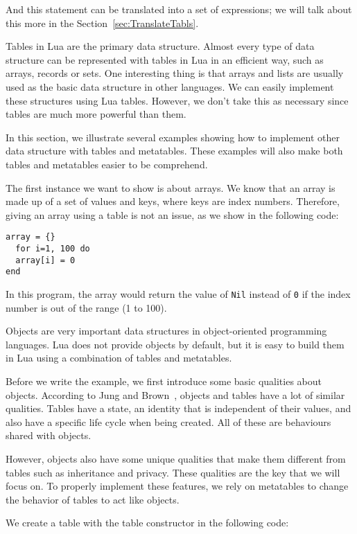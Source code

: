 And this statement can be translated into a set of expressions; we will talk about this more in the Section~\ref{sec:TranslateTabls}.

Tables in Lua are the primary data structure. Almost every type of data structure can be represented with tables in Lua in an efficient way, such as arrays, records or sets. One interesting thing is that arrays and lists are usually used as the basic data structure in other languages. We can easily implement these structures using Lua tables. However, we don't take this as necessary since tables are much more powerful than them.

In this section, we illustrate several examples showing how to implement other data structure with tables and metatables. These examples will also make both tables and metatables easier to be comprehend.

The first instance we want to show is about arrays. We know that an array is made up of a set of values and keys, where keys are index numbers. Therefore, giving an array using a table is not an issue, as we show in the following code:

\begin{verbatim}
array = {}
  for i=1, 100 do
  array[i] = 0
end
\end{verbatim}

In this program, the array would return the value of {\tt Nil} instead of {\tt 0} if the index number is out of the range (1 to 100).

Objects are very important data structures in object-oriented programming languages. Lua does not provide objects by default, but it is easy to build them in Lua using a combination of tables and metatables.

Before we write the example, we first introduce some basic qualities about objects. According to Jung and Brown~\cite{begLua}, objects and tables have a lot of similar qualities. Tables have a state, an identity that is independent of their values, and also have a specific life cycle when being created. All of these are behaviours shared with objects.

However, objects also have some unique qualities that make them different from tables such as inheritance and privacy. These qualities are the key that we will focus on.
To properly implement these features, we rely on metatables to change the behavior of tables to act like objects.

We create a table with the table constructor in the following code:

